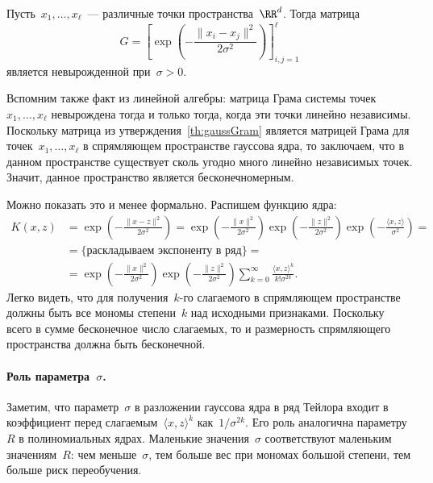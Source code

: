 \documentclass[12pt,fleqn]{article}
\begin{document}
\begin{vkState}
\label{th:gaussGram}
    Пусть~$x_1, \dots, x_\ell$~--- различные точки пространства~$\RR^d$.
    Тогда матрица
    \[
        G = \left[
            \exp\left(
                -\frac{
                    \|x_i - x_j\|^2
                }{
                    2 \sigma^2
                }
            \right)
        \right]_{i, j = 1}^{\ell}
    \]
    является невырожденной при~$\sigma > 0$.
\end{vkState}

Вспомним также факт из линейной алгебры: матрица Грама системы точек~$x_1, \dots, x_\ell$
невырождена тогда и только тогда, когда эти точки линейно независимы.
Поскольку матрица из утверждения~\ref{th:gaussGram} является матрицей Грама
для точек~$x_1, \dots, x_\ell$ в спрямляющем пространстве гауссова ядра,
то заключаем, что в данном пространстве существует сколь угодно много
линейно независимых точек.
Значит, данное пространство является бесконечномерным.

Можно показать это и менее формально.
Распишем функцию ядра:
\begin{align*}
    K(x, z)
    &=
    \exp\left(
        -\frac{
            \|x - z\|^2
        }{
            2 \sigma^2
        }
    \right)
    =
    \exp\left(
        -\frac{
            \|x\|^2
        }{
            2 \sigma^2
        }
    \right)
    \exp\left(
        -\frac{
            \|z\|^2
        }{
            2 \sigma^2
        }
    \right)
    \exp\left(
        -\frac{
            \langle x, z \rangle
        }{
            \sigma^2
        }
    \right)
    =\\
    &=
    \{\text{раскладываем экспоненту в ряд}\}
    =\\
    &=
    \exp\left(
        -\frac{
            \|x\|^2
        }{
            2 \sigma^2
        }
    \right)
    \exp\left(
        -\frac{
            \|z\|^2
        }{
            2 \sigma^2
        }
    \right)
    \sum_{k = 0}^{\infty}
        \frac{
            \langle x, z \rangle^k
        }{
            k! \sigma^{2k}
        }.
\end{align*}
Легко видеть, что для получения~$k$-го слагаемого в спрямляющем пространстве
должны быть все мономы степени~$k$ над исходными признаками.
Поскольку всего в сумме бесконечное число слагаемых, то и размерность
спрямляющего пространства должна быть бесконечной.

\paragraph{Роль параметра~$\sigma$.}
Заметим, что параметр~$\sigma$ в разложении гауссова ядра
в ряд Тейлора входит в коэффициент перед слагаемым~$\langle x, z \rangle^k$
как~$1 / \sigma^{2k}$.
Его роль аналогична параметру~$R$ в полиномиальных ядрах.
Маленькие значения~$\sigma$ соответствуют маленьким значениям~$R$:
чем меньше~$\sigma$, тем больше вес при мономах большой степени, тем
больше риск переобучения.
\end{document}
